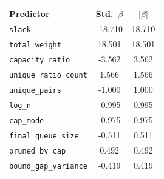 \begin{tabular}{lcc}
\toprule
\textbf{Predictor} & \textbf{Std.~$\beta$} & \textbf{$|\beta|$} \\
\midrule
\texttt{slack} & -18.710 & 18.710 \\
\texttt{total\_weight} & 18.501 & 18.501 \\
\texttt{capacity\_ratio} & -3.562 & 3.562 \\
\texttt{unique\_ratio\_count} & 1.566 & 1.566 \\
\texttt{unique\_pairs} & -1.000 & 1.000 \\
\texttt{log\_n} & -0.995 & 0.995 \\
\texttt{cap\_mode} & -0.975 & 0.975 \\
\texttt{final\_queue\_size} & -0.511 & 0.511 \\
\texttt{pruned\_by\_cap} & 0.492 & 0.492 \\
\texttt{bound\_gap\_variance} & -0.419 & 0.419 \\
\bottomrule
\end{tabular}
